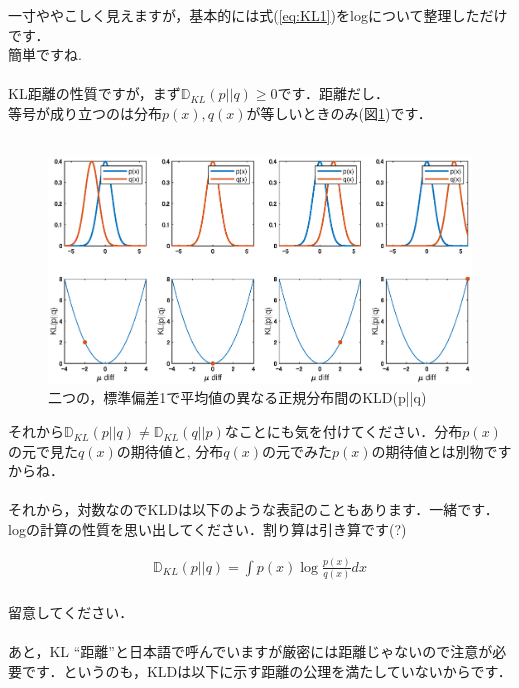 \documentclass[11pt,a4paper]{ujreport}
\begin{document}
一寸ややこしく見えますが，基本的には式(\ref{eq:KL1})をlogについて整理しただけです．\\簡単ですね.\\
\\

KL距離の性質ですが，まず$\mathbb{D}_{KL}(p||q) \geq 0$です．距離だし．\\
等号が成り立つのは分布$p(x), q(x)$が等しいときのみ(図\ref{im:kld1})です．\\
\\
\begin{figure}[H]
  \label{im:kld1}
  \centering
  \includegraphics[width=18cm]{../figures/kld.eps}
  \caption{二つの，標準偏差1で平均値の異なる正規分布間のKLD(p||q)}
\end{figure}

それから$\mathbb{D}_{KL}(p||q) \neq \mathbb{D}_{KL}(q||p)$なことにも気を付けてください．分布$p(x)$の元で見た$q(x)$の期待値と, 分布$q(x)$の元でみた$p(x)$の期待値とは別物ですからね．\\
\\

それから，対数なのでKLDは以下のような表記のこともあります．一緒です．logの計算の性質を思い出してください．割り算は引き算です(?)

\begin{eqnarray}
\label{eq:KLD-inv}
  \mathbb{D}_{KL}(p||q) =  \int p(x) \log \frac{p(x)}{q(x)} dx
\end{eqnarray}
\\
留意してください．\\
\\

あと，KL ``距離''と日本語で呼んでいますが厳密には距離じゃないので注意が必要です．というのも，KLDは以下に示す距離の公理\cite{distance}を満たしていないからです．\\
\\
\end{document}
